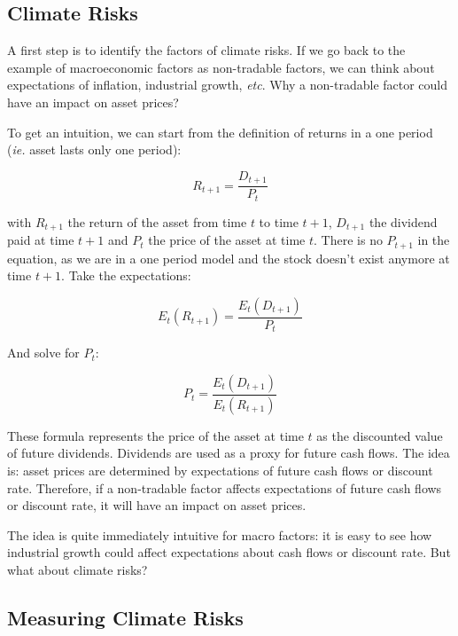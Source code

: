 \subsection{Climate Risks}

A first step is to identify the factors of climate risks.
If we go back to the example of macroeconomic factors 
as non-tradable factors, we can think about expectations 
of inflation, industrial growth, \textit{etc}. 
Why a non-tradable factor could have an impact on asset prices?

To get an intuition, we can start from the definition of 
returns in a one period  (\textit{ie.} asset lasts only one period):

\begin{equation}
    R_{t+1} = \frac{D_{t+1}}{P_t}
\end{equation}

with $R_{t+1}$ the return of the asset from time $t$ to time $t+1$, 
$D_{t+1}$ the dividend paid at time $t+1$ 
and $P_t$ the price of the asset at time $t$.
There is no $P_{t+1}$ in the equation, 
as we are in a one period model and 
the stock doesn't exist anymore at time $t+1$. Take the expectations:

\begin{equation}
    E_t(R_{t+1}) = \frac{E_t(D_{t+1})}{P_t}
\end{equation}

And solve for $P_t$:

\begin{equation}
    P_t = \frac{E_t(D_{t+1})}{E_t(R_{t+1})}
\end{equation}

These formula 
represents the price of the asset at time $t$ 
as the discounted value of future dividends.
Dividends are used as a proxy for future cash flows.
The idea is: asset prices are determined by
expectations of future cash flows or discount rate.
Therefore, if a non-tradable factor affects
expectations of future cash flows or discount rate,
it will have an impact on asset prices.

The idea is quite immediately intuitive for macro factors:
it is easy to see how industrial growth
could affect expectations about cash flows or discount rate. 
But what about climate risks?





\subsection{Measuring Climate Risks}

